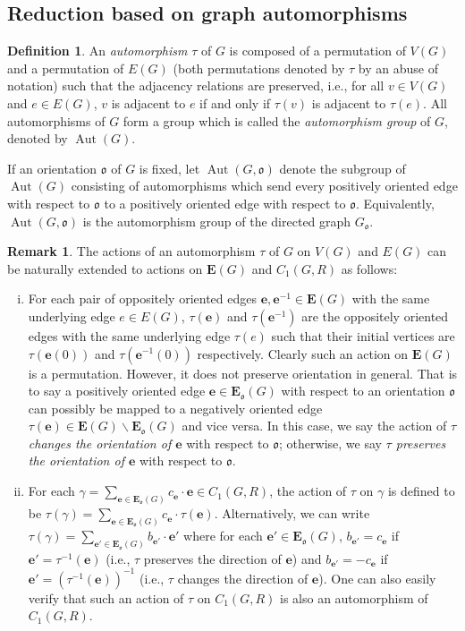 \documentclass[11pt]{amsart}
\renewcommand{\setminus}{\mathbin{\backslash}}%
\theoremstyle{plain}
\theoremstyle{definition}
\newtheorem{definition}[theorem]{Definition}
\newtheorem{remark}[theorem]{Remark}
\newcommand{\mfrako}{{\mathfrak o}}
\newcommand{\ve}{{\mathbf e}}
\newcommand{\vE}{{\mathbf E}}
\DeclareMathOperator{\Aut}{\operatorname{Aut}}
\numberwithin{equation}{section}
\begin{document}
\subsection{Reduction based on graph automorphisms}
\begin{definition}
An \emph{automorphism} $\tau$ of $G$ is composed of a permutation of $V(G)$ and a permutation of $E(G)$ (both permutations denoted by $\tau$ by an abuse of notation) such that the adjacency relations are preserved, i.e., for all $v\in V(G)$ and $e\in E(G)$, $v$ is adjacent to $e$ if and only if $\tau(v)$ is adjacent to $\tau(e)$. All automorphisms of $G$ form a group which is called the \emph{automorphism group} of $G$, denoted by $\Aut(G)$. 

If an orientation $\mfrako$ of $G$ is fixed, let $\Aut(G,\mfrako)$ denote the subgroup of $\Aut(G)$ consisting of automorphisms which send every positively oriented edge with respect to $\mfrako$ to a positively oriented edge with respect to $\mfrako$. Equivalently, $\Aut(G,\mfrako)$ is the automorphism group of the directed graph $G_\mfrako$.
\end{definition}


\begin{remark} \label{R:auto}
The actions of an automorphism $\tau$ of $G$ on $V(G)$ and $E(G)$ can be naturally extended to actions on $\vE(G)$ and $C_1(G,R)$ as follows: 
\begin{enumerate}[(i)]
\item For each pair of oppositely oriented edges $\ve,\ve^{-1}\in \vE(G)$ with the same underlying edge $e\in E(G)$, $\tau(\ve)$ and $\tau(\ve^{-1})$  are the oppositely oriented edges with the same underlying edge $\tau(e)$ such that their initial vertices are $\tau(\ve(0))$ and $\tau(\ve^{-1}(0))$ respectively. Clearly such an action on $\vE(G)$ is a permutation. However, it does not preserve orientation in general. That is to say a positively oriented edge $\ve\in \vE_\mfrako(G)$ with respect to an orientation $\mfrako$ can possibly be mapped to a negatively oriented edge $\tau(\ve)\in  \vE(G)\setminus \vE_{\mfrako}(G)$  and vice versa. In this case, we say the action of \emph{$\tau$ changes the orientation of $\ve$} with respect to $\mfrako$; otherwise, we say \emph{$\tau$ preserves the orientation of $\ve$} with respect to $\mfrako$.
\item For each $\gamma=\sum_{\ve\in \vE_\mfrako(G)}c_{\ve}\cdot \ve \in C_1(G,R)$, the action of $\tau$ on $\gamma$ is defined to be $\tau(\gamma)=\sum_{\ve\in \vE_\mfrako(G)}c_{\ve}\cdot \tau(\ve)$. Alternatively, we can write $\tau(\gamma) = \sum_{\ve'\in \vE_\mfrako(G)}b_{\ve'}\cdot \ve'$ where for each $\ve'\in \vE_\mfrako(G)$, $b_{\ve'}=c_{\ve}$ if $\ve'=\tau^{-1}(\ve)$ (i.e., $\tau$ preserves the direction of $\ve$) and $b_{\ve'}=-c_{\ve}$ if $\ve'=(\tau^{-1}(\ve))^{-1}$ (i.e., $\tau$ changes the direction of $\ve$). One can also easily verify that such an action of $\tau$ on $C_1(G,R)$ is also an automorphism of $C_1(G,R)$. 
\end{enumerate}
\end{remark}
\end{document}
